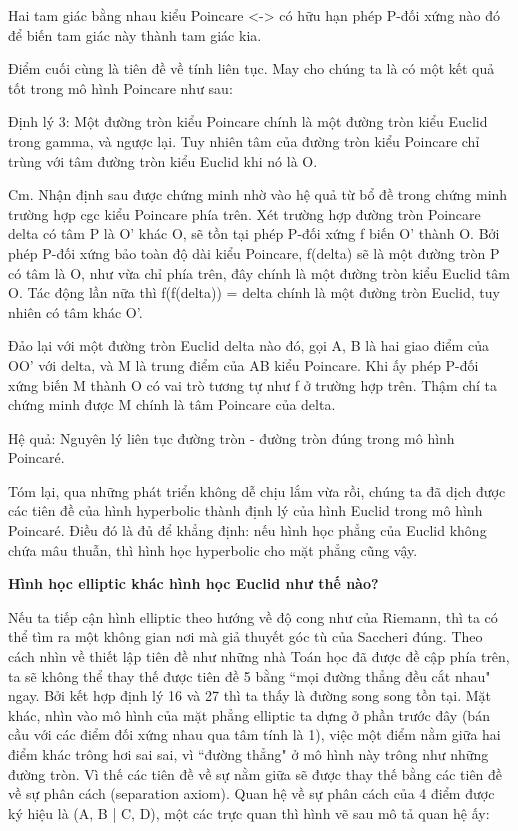 \begin{multicols}{2}
	Hai tam giác bằng nhau kiểu Poincare <-> có hữu hạn phép P-đối xứng nào đó để biến tam giác này thành tam giác kia.
	
	
	Điểm cuối cùng là tiên đề về tính liên tục. May cho chúng ta là có một kết quả tốt trong mô hình Poincare như sau:
	
	Định lý 3: Một đường tròn kiểu Poincare chính là một đường tròn kiểu Euclid trong gamma, và ngược lại. Tuy nhiên tâm của đường tròn kiểu Poincare chỉ trùng với tâm đường tròn kiểu Euclid khi nó là O.
	
	Cm. Nhận định sau được chứng minh nhờ vào hệ quả từ bổ đề trong chứng minh trường hợp cgc kiểu Poincare phía trên. 
	Xét trường hợp đường tròn Poincare delta có tâm P là O’ khác O, sẽ tồn tại phép P-đối xứng f biến O’ thành O. Bởi phép P-đối xứng bảo toàn độ dài kiểu Poincare, f(delta) sẽ là một đường tròn P có tâm là O, như vừa chỉ phía trên, đây chính là một đường tròn kiểu Euclid tâm O. Tác động lần nữa thì f(f(delta)) = delta chính là một đường tròn Euclid, tuy nhiên có tâm khác O’.
	
	Đảo lại với một đường tròn Euclid delta nào đó, gọi A, B là hai giao điểm của OO’ với delta, và M là trung điểm của AB kiểu Poincare. Khi ấy phép P-đối xứng biến M thành O có vai trò tương tự như f ở trường hợp trên. Thậm chí ta chứng minh được M chính là tâm Poincare của delta.
	
	Hệ quả: Nguyên lý liên tục đường tròn - đường tròn đúng trong mô hình Poincaré.
	
	Tóm lại, qua những phát triển không dễ chịu lắm vừa rồi, chúng ta đã dịch được các tiên đề của hình hyperbolic thành định lý của hình Euclid trong mô hình Poincaré. Điều đó là đủ để khẳng định: nếu hình học phẳng của Euclid không chứa mâu thuẫn, thì hình học hyperbolic cho mặt phẳng cũng vậy.
	
	\textbf{\color{lichsutoanhoc}Hình học elliptic khác hình học Euclid như thế nào?}
	
	Nếu ta tiếp cận hình elliptic theo hướng về độ cong như của Riemann, thì ta có thể tìm ra một không gian nơi mà giả thuyết góc tù của Saccheri đúng. Theo cách nhìn về thiết lập tiên đề như những nhà Toán học đã được đề cập phía trên, ta sẽ không thể thay thế được tiên đề 5 bằng ``mọi đường thẳng đều cắt nhau" ngay. Bởi kết hợp định lý 16 và 27 thì ta thấy là đường song song tồn tại. Mặt khác, nhìn vào mô hình của mặt phẳng elliptic ta dựng ở phần trước đây (bán cầu với các điểm đối xứng nhau qua tâm tính là 1), việc một điểm nằm giữa hai điểm khác trông hơi sai sai, vì ``đường thẳng" ở mô hình này trông như những đường tròn. Vì thế các tiên đề về sự nằm giữa sẽ được thay thế bằng các tiên đề về sự phân cách (separation axiom). Quan hệ về sự phân cách của 4 điểm được ký hiệu là (A, B | C, D), một các trực quan thì hình vẽ sau mô tả quan hệ ấy:
	

\end{multicols}
